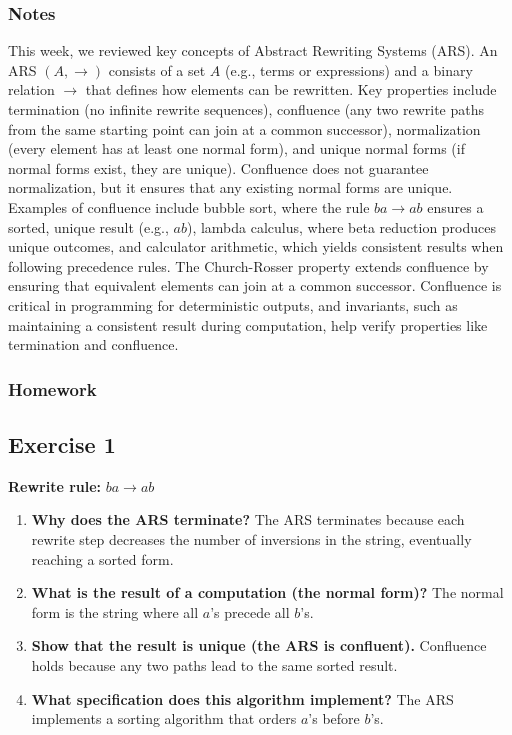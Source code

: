 \documentclass{article}
\theoremstyle{theorem}
\theoremstyle{definition}
\theoremstyle{remark}
\begin{document}
\subsubsection*{Notes}
This week, we reviewed key concepts of Abstract Rewriting Systems (ARS). An ARS \((A, \to)\) consists of a set \(A\) (e.g., terms or expressions) and a binary relation \(\to\) that defines how elements can be rewritten. Key properties include termination (no infinite rewrite sequences), confluence (any two rewrite paths from the same starting point can join at a common successor), normalization (every element has at least one normal form), and unique normal forms (if normal forms exist, they are unique). Confluence does not guarantee normalization, but it ensures that any existing normal forms are unique. Examples of confluence include bubble sort, where the rule \(ba \to ab\) ensures a sorted, unique result (e.g., \(ab\)), lambda calculus, where beta reduction produces unique outcomes, and calculator arithmetic, which yields consistent results when following precedence rules. The Church-Rosser property extends confluence by ensuring that equivalent elements can join at a common successor. Confluence is critical in programming for deterministic outputs, and invariants, such as maintaining a consistent result during computation, help verify properties like termination and confluence.


\subsubsection*{Homework}

\subsection*{Exercise 1}
\textbf{Rewrite rule:} \( ba \to ab \)
\begin{enumerate}
    \item \textbf{Why does the ARS terminate?} The ARS terminates because each rewrite step decreases the number of inversions in the string, eventually reaching a sorted form.
    \item \textbf{What is the result of a computation (the normal form)?} The normal form is the string where all \( a \)'s precede all \( b \)'s.
    \item \textbf{Show that the result is unique (the ARS is confluent).} Confluence holds because any two paths lead to the same sorted result.
    \item \textbf{What specification does this algorithm implement?} The ARS implements a sorting algorithm that orders \( a \)'s before \( b \)'s.
\end{enumerate}
\end{document}
